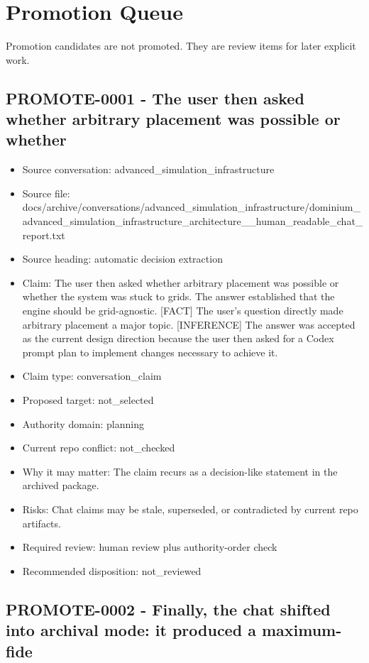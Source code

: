 \documentclass[11pt,a4paper]{report}
\begin{document}
\section{Promotion Queue}

Promotion candidates are not promoted. They are review items for later explicit work.


\subsection{PROMOTE-0001 - The user then asked whether arbitrary placement was possible or whether}

\begin{itemize}
\item Source conversation: advanced\_simulation\_infrastructure
\item Source file: docs/archive/conversations/advanced\_simulation\_infrastructure/dominium\_advanced\_simulation\_infrastructure\_architecture\_\_human\_readable\_chat\_report.txt
\item Source heading: automatic decision extraction
\item Claim: The user then asked whether arbitrary placement was possible or whether the system was stuck to grids. The answer established that the engine should be grid-agnostic. [FACT] The user's question directly made arbitrary placement a major topic. [INFERENCE] The answer was accepted as the current design direction because the user then asked for a Codex prompt plan to implement changes necessary to achieve it.
\item Claim type: conversation\_claim
\item Proposed target: not\_selected
\item Authority domain: planning
\item Current repo conflict: not\_checked
\item Why it may matter: The claim recurs as a decision-like statement in the archived package.
\item Risks: Chat claims may be stale, superseded, or contradicted by current repo artifacts.
\item Required review: human review plus authority-order check
\item Recommended disposition: not\_reviewed
\end{itemize}

\subsection{PROMOTE-0002 - Finally, the chat shifted into archival mode: it produced a maximum-fide}
\end{document}
